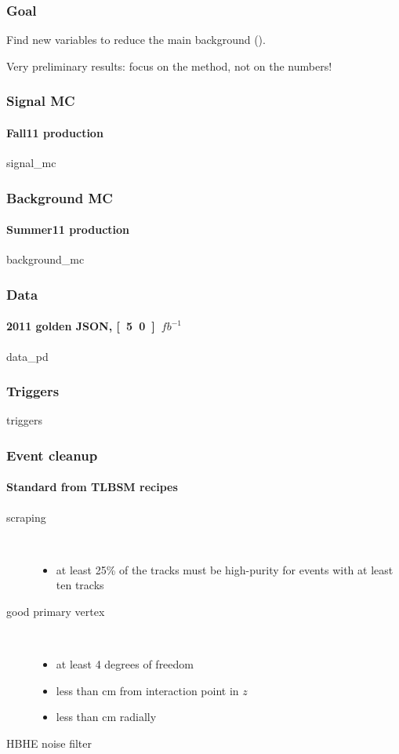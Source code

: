 \documentclass[ukenglish]{beamer}
\begin{document}
\begin{frame}
    \frametitle{Goal}
    \begin{block}
        {}
        Find new variables to reduce the main background (\ttbar).
    \end{block}
    \alert{Very preliminary results: focus on the method, not on the numbers!}
\end{frame}


\begin{frame}
    \frametitle{Signal MC}
    \framesubtitle{Fall11 production}
    {signal_mc}
\end{frame}

\begin{frame}
    \frametitle{Background MC}
    \framesubtitle{Summer11 production}
    {background_mc}
\end{frame}

\begin{frame}
    \frametitle{Data}
    \framesubtitle{2011 golden JSON, \unit[5.0]{$fb^{-1}$}}
    {data_pd}
\end{frame}

\begin{frame}
    \frametitle{Triggers}
    {triggers}
\end{frame}

\begin{frame}
    \frametitle{Event cleanup}
    \framesubtitle{Standard from TLBSM recipes}
    \begin{description}
        \item[scraping]\hspace*{\fill}\\
            \begin{itemize}
                \item at least 25\% of the tracks must be high-purity for events
            with at least ten tracks
            \end{itemize}
        \item[good primary vertex] \hspace*{\fill}\\
            \begin{itemize}
                \item at least 4 degrees of freedom
                \item less than \unit[25]{cm} from interaction point in $z$
                \item less than \unit[2]{cm} radially
            \end{itemize}
        \item[HBHE noise filter] 
    \end{description}
\end{frame}
\end{document}
